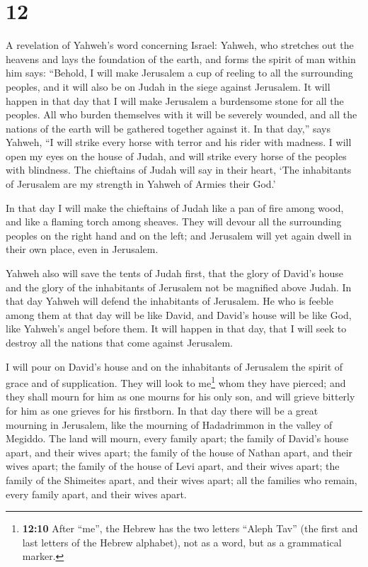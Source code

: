 \hypertarget{section-11}{%
\section{12}\label{section-11}}

 A revelation of Yahweh's word concerning Israel: Yahweh,
who stretches out the heavens and lays the foundation of the earth, and
forms the spirit of man within him says:  ``Behold, I will
make Jerusalem a cup of reeling to all the surrounding peoples, and it
will also be on Judah in the siege against Jerusalem.  It
will happen in that day that I will make Jerusalem a burdensome stone
for all the peoples. All who burden themselves with it will be severely
wounded, and all the nations of the earth will be gathered together
against it.  In that day,'' says Yahweh, ``I will strike
every horse with terror and his rider with madness. I will open my eyes
on the house of Judah, and will strike every horse of the peoples with
blindness.  The chieftains of Judah will say in their
heart, `The inhabitants of Jerusalem are my strength in Yahweh of Armies
their God.'

 In that day I will make the chieftains of Judah like a
pan of fire among wood, and like a flaming torch among sheaves. They
will devour all the surrounding peoples on the right hand and on the
left; and Jerusalem will yet again dwell in their own place, even in
Jerusalem.

 Yahweh also will save the tents of Judah first, that the
glory of David's house and the glory of the inhabitants of Jerusalem not
be magnified above Judah.  In that day Yahweh will defend
the inhabitants of Jerusalem. He who is feeble among them at that day
will be like David, and David's house will be like God, like Yahweh's
angel before them.  It will happen in that day, that I
will seek to destroy all the nations that come against Jerusalem.

 I will pour on David's house and on the inhabitants of
Jerusalem the spirit of grace and of supplication. They will look to
me\footnote{\textbf{12:10} After ``me'', the Hebrew has the two letters
  ``Aleph Tav'' (the first and last letters of the Hebrew alphabet), not
  as a word, but as a grammatical marker.} whom they have pierced; and
they shall mourn for him as one mourns for his only son, and will grieve
bitterly for him as one grieves for his firstborn.  In
that day there will be a great mourning in Jerusalem, like the mourning
of Hadadrimmon in the valley of Megiddo.  The land will
mourn, every family apart; the family of David's house apart, and their
wives apart; the family of the house of Nathan apart, and their wives
apart;  the family of the house of Levi apart, and their
wives apart; the family of the Shimeites apart, and their wives apart;
 all the families who remain, every family apart, and
their wives apart.

